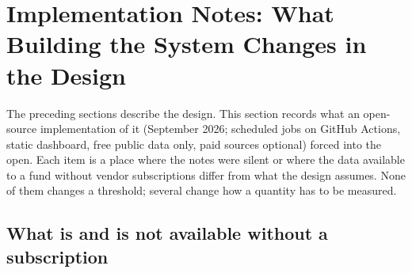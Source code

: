 \documentclass[11pt,a4paper]{article}
\theoremstyle{definition}
\begin{document}
\section{Implementation Notes: What Building the System Changes in the Design}\label{sec:implementation}

The preceding sections describe the design. This section records what an open-source implementation of it (September 2026; scheduled jobs on GitHub Actions, static dashboard, free public data only, paid sources optional) forced into the open. Each item is a place where the notes were silent or where the data available to a fund without vendor subscriptions differ from what the design assumes. None of them changes a threshold; several change how a quantity has to be measured.

\subsection{What is and is not available without a subscription}
\end{document}
